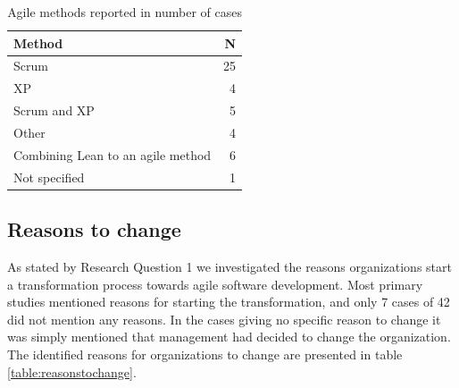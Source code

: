 \documentclass[preprint,authoryear,12pt]{elsarticle}
\begin{document}
\begin{table}[t]
    \begin{tabular}{ l r }
        \toprule
        Method                             &  N  \\
        \midrule
        Scrum                              &  25 \\
        XP                                 &  4  \\
        Scrum and XP                       &  5  \\
        Other                              &  4  \\
        Combining Lean to an agile method  &  6  \\
        Not specified                      &  1  \\
        \bottomrule
    \end{tabular}
    \caption{Agile methods reported in number of cases}
    \label{table:agilemethods}
\end{table}

\subsection{Reasons to change}

As stated by Research Question 1 we investigated the reasons organizations start
a transformation process towards agile software development. Most primary
studies mentioned reasons for starting the transformation, and only 7 cases of
42 did not mention any reasons. In the cases giving no specific reason to change
it was simply mentioned that management had decided to change the organization.
The identified reasons for organizations to change are presented in table
\ref{table:reasonstochange}.


\end{document}
